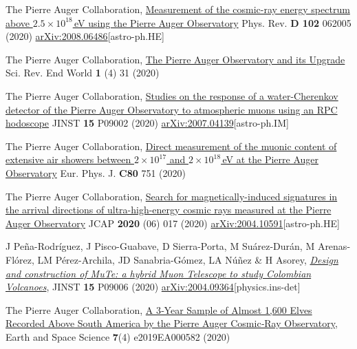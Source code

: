 \begin{etaremune}
\item {}The Pierre Auger Collaboration, \href{https://doi.org/10.1103/PhysRevD.102.062005}{Measurement of the cosmic-ray energy spectrum above $2.5\times 10^{18}$\,eV using the Pierre Auger Observatory} Phys. Rev. {\bf{D 102}} 062005 (2020) \href{https://arxiv.org/abs/2008.06486}{arXiv:2008.06486}[astro-ph.HE]

\item {}The Pierre Auger Collaboration, \href{https://doi.org/10.52712/sciencereviews.v1i4.31}{The Pierre Auger Observatory and its Upgrade} Sci. Rev. End World {\bf{1}} (4) 31 (2020)

\item {}The Pierre Auger Collaboration, \href{https://doi.org/10.1088/1748-0221/15/09/P09002}{Studies on the response of a water-Cherenkov detector of the Pierre Auger Observatory to atmospheric muons using an RPC hodoscope} JINST {\bf{15}} P09002 (2020) \href{https://arxiv.org/abs/2007.04139}{arXiv:2007.04139}[astro-ph.IM]

\item {}The Pierre Auger Collaboration, \href{https://doi.org/10.1140/epjc/s10052-020-8055-y}{Direct measurement of the muonic content of extensive air showers between $2\times 10^{17}$ and $2\times 10^{18}$\,eV at the Pierre Auger Observatory} Eur. Phys. J. {\bf{C80}} 751 (2020)


\item {}The Pierre Auger Collaboration, \href{https://doi.org/10.1088/1475-7516/2020/06/017}{Search for magnetically-induced signatures in the arrival directions of ultra-high-energy cosmic rays measured at the Pierre Auger Observatory} JCAP {\bf{2020}} (06) 017 (2020) \href{https://arxiv.org/abs/2004.10591}{arXiv:2004.10591}[astro-ph.HE]

\item {} J Peña-Rodríguez, J Pisco-Guabave, D Sierra-Porta, M Suárez-Durán, M Arenas-Flórez, LM Pérez-Archila, JD Sanabria-Gómez, LA Núñez \& H Asorey, \href{https://doi.org/10.1088/1748-0221/15/09/P09006}{\emph{Design and construction of MuTe: a hybrid Muon Telescope to study Colombian Volcanoes}}, JINST {\bf{15}} P09006 (2020) \href{https://arxiv.org/abs/2004.09364}{arXiv:2004.09364}[physics.ins-det]

\item {}The Pierre Auger Collaboration, \href{https://doi.org/10.1029/2019EA000582}{A 3‐Year Sample of Almost 1,600 Elves Recorded Above South America by the Pierre Auger Cosmic‐Ray Observatory}, Earth and Space Science {\bf{7}}(4) e2019EA000582 (2020) %


\end{etaremune}
